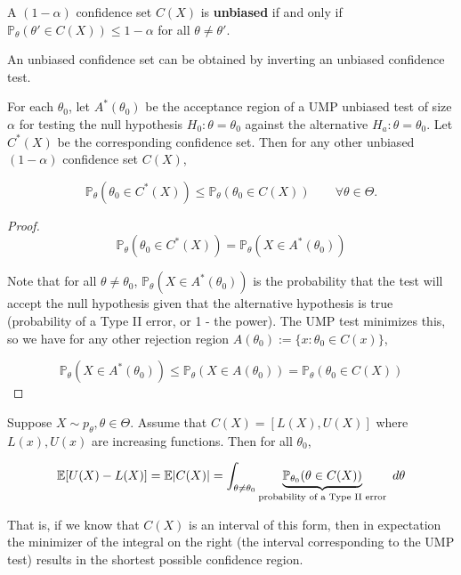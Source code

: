 \begin{definition}

A \((1 - \alpha)\) confidence set \(C(X)\) is \textbf{unbiased} if and only if \(\mathbb{P}_\theta(\theta' \in C(X)) \leq 1 - \alpha\) for all \(\theta \neq \theta'\).

\end{definition}

An unbiased confidence set can be obtained by inverting an unbiased confidence test. 

\begin{theorem}

For each \(\theta_0\), let \(A^*(\theta_0)\) be the acceptance region of a UMP unbiased test of size \(\alpha\) for testing the null hypothesis \(H_0: \theta = \theta_0\) against the alternative \(H_a: \theta = \theta_0\). Let \(C^*(X)\) be the corresponding confidence set. Then for any other unbiased \((1 - \alpha)\) confidence set \(C(X)\),

\[
\mathbb{P}_\theta (\theta_0 \in C^*(X)) \leq \mathbb{P}_\theta(\theta_0 \in C(X)) \qquad \forall \theta \in \Theta.
\] 

\end{theorem}

\begin{proof}

\[
\mathbb{P}_\theta(\theta_0 \in C^*(X)) = \mathbb{P}_\theta(X \in A^*(\theta_0))
\]

Note that for all \(\theta \neq \theta_0\), \(\mathbb{P}_\theta(X \in A^*(\theta_0))\) is the probability that the test will accept the null hypothesis given that the alternative hypothesis is true (probability of a Type II error, or 1 - the power). The UMP test minimizes this, so we have for any other rejection region \(A(\theta_0) := \{x: \theta_0 \in C(x)\}\),

\[
 \mathbb{P}_\theta(X \in A^*(\theta_0)) \leq  \mathbb{P}_\theta(X \in A(\theta_0)) = \mathbb{P}_\theta(\theta_0 \in C(X))
\]



\end{proof}

\begin{theorem}\label{mathstats.thm.pratt} 

Suppose \(X \sim p_\theta, \theta \in \Theta\). Assume that \(C(X) = [L(X), U(X)]\) where \(L(x), U(x)\) are increasing functions. Then for all \(\theta_0\),

\[
\E [U(X) - L(X)] = \E| C(X)| = \int_{\theta \neq \theta_0}  \underbrace{\mathbb{P}_{\theta_0}( \theta \in C(X))}_{\text{probability of a Type II error}} \ d \theta
\]

That is, if we know that \(C(X)\) is an interval of this form, then in expectation the minimizer of the integral on the right (the interval corresponding to the UMP test) results in the shortest possible confidence region. 

\end{theorem}

